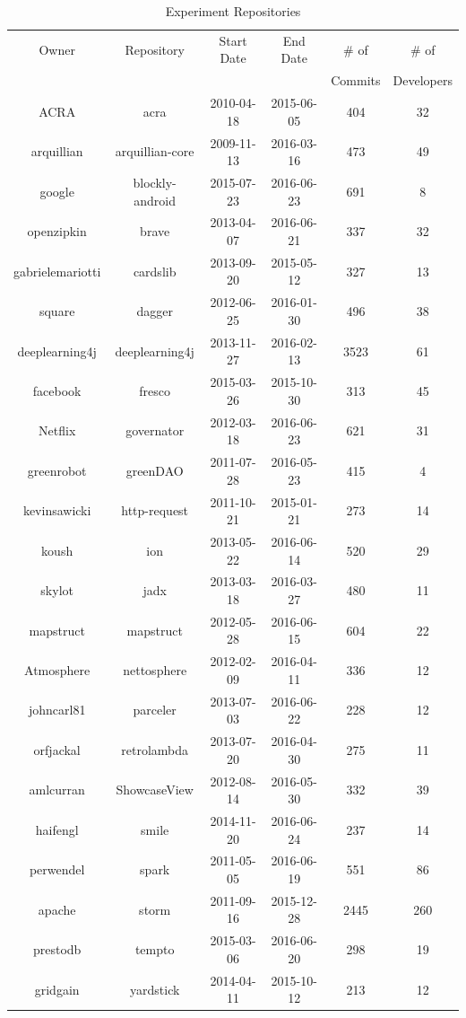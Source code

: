 \begin{table}[!hbp]
\begin{center}
    \begin{tabular}{|c|c|c|c|c|c|}
        \hline
        Owner & Repository & Start Date & End Date & \# of & \# of \\
         & & & & Commits & Developers \\
        \hline
        ACRA & acra & 2010-04-18 & 2015-06-05 & 404 & 32 \\
        arquillian & arquillian-core & 2009-11-13 & 2016-03-16 & 473 & 49 \\
        google & blockly-android & 2015-07-23 & 2016-06-23 & 691 & 8 \\
        openzipkin & brave & 2013-04-07 & 2016-06-21 & 337 & 32 \\
        gabrielemariotti & cardslib & 2013-09-20 & 2015-05-12 & 327 & 13 \\
        square & dagger & 2012-06-25 & 2016-01-30 & 496 & 38 \\
        deeplearning4j & deeplearning4j & 2013-11-27 & 2016-02-13 & 3523 & 61 \\
        facebook & fresco & 2015-03-26 & 2015-10-30 & 313 & 45 \\
        Netflix & governator & 2012-03-18 & 2016-06-23 & 621 & 31 \\
        greenrobot & greenDAO & 2011-07-28 & 2016-05-23 & 415 & 4 \\
        kevinsawicki & http-request & 2011-10-21 & 2015-01-21 & 273 & 14 \\
        koush & ion & 2013-05-22 & 2016-06-14 & 520 & 29 \\
        skylot & jadx & 2013-03-18 & 2016-03-27 & 480 & 11 \\
        mapstruct & mapstruct & 2012-05-28 & 2016-06-15 & 604 & 22 \\
        Atmosphere & nettosphere & 2012-02-09 & 2016-04-11 & 336 & 12 \\
        johncarl81 & parceler & 2013-07-03 & 2016-06-22 & 228 & 12 \\
        orfjackal & retrolambda & 2013-07-20 & 2016-04-30 & 275 & 11 \\
        amlcurran & ShowcaseView & 2012-08-14 & 2016-05-30 & 332 & 39 \\
        haifengl & smile & 2014-11-20 & 2016-06-24 & 237 & 14 \\
        perwendel & spark & 2011-05-05 & 2016-06-19 & 551 & 86 \\
        apache & storm & 2011-09-16 & 2015-12-28 & 2445 & 260 \\
        prestodb & tempto & 2015-03-06 & 2016-06-20 & 298 & 19 \\
        gridgain & yardstick & 2014-04-11 & 2015-10-12 & 213 & 12 \\
        \hline
    \end{tabular}
\end{center}
\caption{Experiment Repositories}
\label{tab:repositories_summary}
\end{table}

